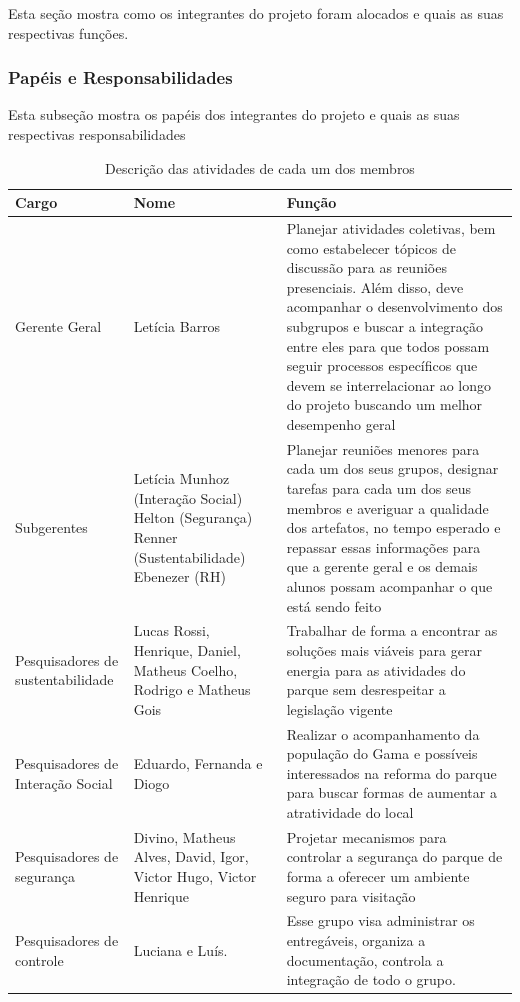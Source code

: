 Esta se\c{c}\~ao mostra como os integrantes do projeto foram alocados e quais as suas respectivas fun\c{c}\~oes.

\subsubsection{Pap\'eis e Responsabilidades}
Esta subse\c{c}\~ao mostra os pap\'eis dos integrantes do projeto e quais as suas respectivas responsabilidades

\begin{table}[h!]
\caption{Descri\c{c}\~ao das atividades de cada um dos membros} 
\begin{center}
\begin{tabular}{|p{3cm}|p{4cm}|p{8cm}|} \hline

Cargo &Nome &Fun\c{c}\~ao\\ \hline 

Gerente Geral &Let\'icia Barros &Planejar atividades coletivas, bem como estabelecer t\'opicos de discuss\~ao para as reuni\~oes presenciais. Al\'em disso, deve acompanhar o desenvolvimento dos subgrupos e buscar a integra\c{c}\~ao entre eles para que todos possam seguir processos espec\'ificos que devem se interrelacionar ao longo do projeto buscando um melhor desempenho geral \\ \hline

Subgerentes &Let\'icia Munhoz (Intera\c{c}\~ao Social)  Helton (Seguran\c{c}a)  Renner (Sustentabilidade)  Ebenezer (RH) &Planejar reuni\~oes menores para cada um dos seus grupos, designar tarefas para cada um dos seus membros e averiguar a qualidade dos artefatos, no tempo esperado e repassar essas informa\c{c}\~oes para que a gerente geral e os demais alunos possam acompanhar o que est\'a sendo feito \\ \hline

Pesquisadores de sustentabilidade &Lucas Rossi, Henrique, Daniel, Matheus Coelho, Rodrigo e Matheus Gois &Trabalhar de forma a encontrar as solu\c{c}\~oes mais vi\'aveis para gerar energia para as atividades do parque sem desrespeitar a legisla\c{c}\~ao vigente \\ \hline
Pesquisadores de Intera\c{c}\~ao Social &Eduardo, Fernanda e Diogo &Realizar o acompanhamento da popula\c{c}\~ao do Gama e poss\'iveis interessados na reforma do parque para buscar formas de aumentar a atratividade do local \\ \hline 

Pesquisadores de seguran\c{c}a &Divino, Matheus Alves, David, Igor, Victor Hugo, Victor Henrique &Projetar mecanismos para controlar a seguran\c{c}a do parque de forma a oferecer um ambiente seguro para visita\c{c}\~ao \\ \hline

Pesquisadores de controle &Luciana e Lu\'is. &Esse grupo visa administrar os entreg\'aveis, organiza a documenta\c{c}\~ao, controla a integra\c{c}\~ao de todo o grupo. \\ \hline

 \end{tabular}
\end{center}
\end{table}

